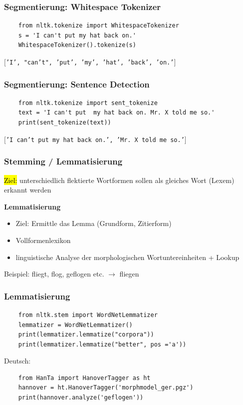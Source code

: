     
\begin{frame}[fragile]
    \frametitle{Segmentierung: Whitespace Tokenizer}
   
   \begin{verbatim}
    from nltk.tokenize import WhitespaceTokenizer
    s = 'I can't put my hat back on.'
    WhitespaceTokenizer().tokenize(s)
    \end{verbatim}

    \texttt{$[$'I', "can't", 'put', 'my', 'hat', 'back', 'on.'$]$}
\end{frame}
 
    
\begin{frame}[fragile]
    \frametitle{Segmentierung: Sentence Detection}
    
    \begin{verbatim}
    from nltk.tokenize import sent_tokenize
    text = 'I can't put  my hat back on. Mr. X told me so.'
    print(sent_tokenize(text))
    \end{verbatim}

    \texttt{$[$'I can't put  my hat back on.', 'Mr. X told me so.'$]$}
\end{frame}
    

\begin{frame}
    \frametitle{Stemming / Lemmatisierung}
    \hl{Ziel:} unterschiedlich flektierte Wortformen sollen als gleiches Wort (Lexem) erkannt werden
    
    \textbf{Lemmatisierung}
    \begin{itemize}
    \item Ziel: Ermittle das Lemma (Grundform, Zitierform)
    \item Vollformenlexikon
    \item linguistische Analyse der morphologischen Wortuntereinheiten + Lookup 
    \end{itemize}
    Beispiel: 
    fliegt, flog, geflogen etc. $\rightarrow$ fliegen
\end{frame}
    
    
\begin{frame}[fragile]
    \frametitle{Lemmatisierung}


    \begin{verbatim}
    from nltk.stem import WordNetLemmatizer 
    lemmatizer = WordNetLemmatizer()
    print(lemmatizer.lemmatize("corpora"))
    print(lemmatizer.lemmatize("better", pos ='a'))
    \end{verbatim}

    Deutsch:
    \begin{verbatim}
    from HanTa import HanoverTagger as ht
    hannover = ht.HanoverTagger('morphmodel_ger.pgz')
    print(hannover.analyze('geflogen'))
    \end{verbatim}
\end{frame}
    
